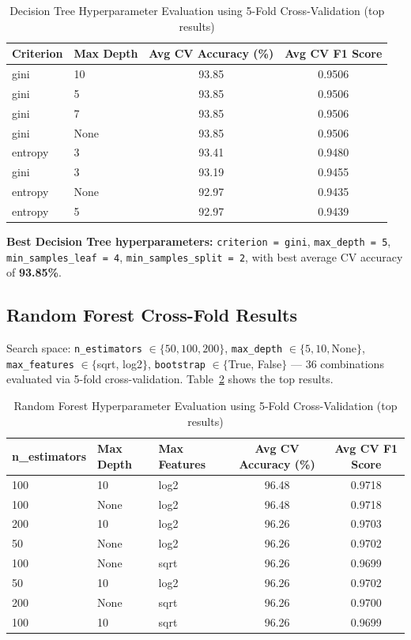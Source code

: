 \documentclass[11pt,a4paper]{article}
\begin{document}
\begin{table}[h]
\centering
\caption{Decision Tree Hyperparameter Evaluation using 5-Fold Cross-Validation (top results)}
\label{tab:dt_cv}
\begin{tabular}{llcc}
\toprule
\textbf{Criterion} & \textbf{Max Depth} & \textbf{Avg CV Accuracy (\%)} & \textbf{Avg CV F1 Score} \\
\midrule
gini    & 10        & 93.85 & 0.9506 \\
gini    & 5         & 93.85 & 0.9506 \\
gini    & 7         & 93.85 & 0.9506 \\
gini    & None      & 93.85 & 0.9506 \\
entropy & 3         & 93.41 & 0.9480 \\
gini    & 3         & 93.19 & 0.9455 \\
entropy & None      & 92.97 & 0.9435 \\
entropy & 5         & 92.97 & 0.9439 \\
\bottomrule
\end{tabular}
\end{table}

\textbf{Best Decision Tree hyperparameters:} \texttt{criterion = gini}, \texttt{max\_depth = 5},
\texttt{min\_samples\_leaf = 4}, \texttt{min\_samples\_split = 2}, with best average CV accuracy of
\textbf{93.85\%}.

\subsection{Random Forest Cross-Fold Results}
Search space: \texttt{n\_estimators} $\in \{50,100,200\}$, \texttt{max\_depth} $\in \{5,10,$None$\}$,
\texttt{max\_features} $\in \{$sqrt, log2$\}$, \texttt{bootstrap} $\in \{$True, False$\}$ ---
36 combinations evaluated via 5-fold cross-validation. Table~\ref{tab:rf_cv} shows the top results.

\begin{table}[h]
\centering
\caption{Random Forest Hyperparameter Evaluation using 5-Fold Cross-Validation (top results)}
\label{tab:rf_cv}
\begin{tabular}{lllcc}
\toprule
\textbf{n\_estimators} & \textbf{Max Depth} & \textbf{Max Features} & \textbf{Avg CV Accuracy (\%)} & \textbf{Avg CV F1 Score} \\
\midrule
100 & 10   & log2 & 96.48 & 0.9718 \\
100 & None & log2 & 96.48 & 0.9718 \\
200 & 10   & log2 & 96.26 & 0.9703 \\
50  & None & log2 & 96.26 & 0.9702 \\
100 & None & sqrt & 96.26 & 0.9699 \\
50  & 10   & log2 & 96.26 & 0.9702 \\
200 & None & sqrt & 96.26 & 0.9700 \\
100 & 10   & sqrt & 96.26 & 0.9699 \\
\bottomrule
\end{tabular}
\end{table}
\end{document}

